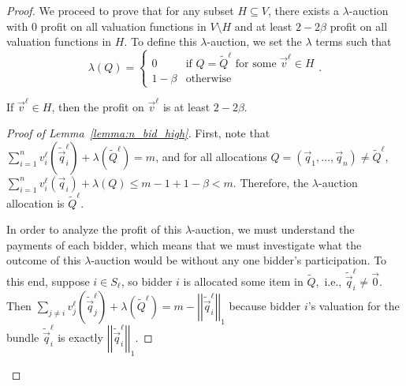 \begin{proof}
We proceed to prove that for any subset $H \subseteq V$, there exists a $\lambda$-auction with 0 profit on all valuation functions in $V \setminus H$ and at least $2-2\beta$ profit on all valuation functions in $H$. To define this $\lambda$-auction, we set the $\lambda$ terms such that \[\lambda\left(Q\right) = \begin{cases}
0 &\text{if } Q = \tilde{Q}^\ell \text{ for some } \vec{v}^\ell \in H\\
1 - \beta &\text{otherwise}\end{cases}.\]


\begin{lemma}\label{lemma:n_bid_high}
If $\vec{v}^\ell \in H$, then the profit on $\vec{v}^\ell$ is at least $2-2\beta$.
\end{lemma}

\begin{proof}[Proof of Lemma~\ref{lemma:n_bid_high}]
First, note that $\sum_{i = 1}^n v_i^\ell\left(\tilde{\vec{q}}_i^{\ell}\right) + \lambda\left(\tilde{Q}^\ell\right) = m$, and for all allocations $Q = \left(\vec{q}_1, \dots, \vec{q}_n\right) \not = \tilde{Q}^\ell$, $\sum_{i = 1}^n v_i^\ell\left(\vec{q}_i\right) + \lambda\left(Q\right) \leq m-1+1-\beta < m$. Therefore, the $\lambda$-auction allocation is $\tilde{Q}^\ell$.

In order to analyze the profit of this $\lambda$-auction, we must understand the payments of each bidder, which means that we must investigate what the outcome of this $\lambda$-auction would be without any one bidder's participation. To this end, suppose $i \in S_\ell$, so bidder $i$ is allocated some item in $\tilde{Q},$ i.e., $\tilde{\vec{q}}_i^{\ell} \not= \vec{0}$. Then $\sum_{j \not= i} v_j^\ell\left(\tilde{\vec{q}}_j^\ell\right) + \lambda\left(\tilde{Q}^\ell\right) = m-\left|\left|\tilde{\vec{q}}_i^{\ell}\right|\right|_1$ because bidder $i$'s valuation for the bundle $\tilde{\vec{q}}_i^{\ell}$ is exactly $\left|\left|\tilde{\vec{q}}_i^{\ell}\right|\right|_1$.


\end{proof}
\end{proof}
